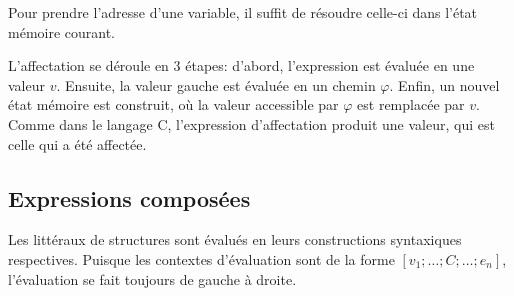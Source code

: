 Pour prendre l'adresse d'une variable, il suffit de résoudre celle-ci dans
l'état mémoire courant.

\begin{mathpar}
\end{mathpar}

L'affectation se déroule en 3 étapes: d'abord, l'expression est évaluée en une
valeur $v$. Ensuite, la valeur gauche est évaluée en un chemin $φ$. Enfin, un
nouvel état mémoire est construit, où la valeur accessible par $φ$ est remplacée
par $v$. Comme dans le langage C, l'expression d'affectation produit une valeur,
qui est celle qui a été affectée.

\begin{mathpar}
\end{mathpar}

\subsection*{Expressions composées}

Les littéraux de structures sont évalués en leurs constructions syntaxiques
respectives. Puisque les contextes d'évaluation sont de la forme $ [ v_1 ; … ; C
; … ; e_n ] $, l'évaluation se fait toujours de gauche à droite.

\begin{mathpar}

\end{mathpar}







